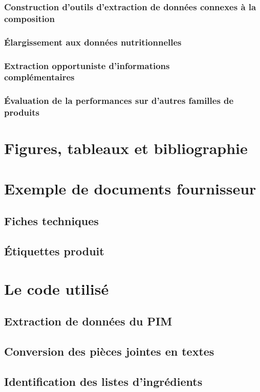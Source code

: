 \documentclass{report}
\begin{document}
        \section{Construction d'outils d'extraction de données connexes à la composition}
        \section{\'{E}largissement aux données nutritionnelles}
        \section{Extraction \og opportuniste \fg d'informations \\ complémentaires}
        \section{\'{E}valuation de la performances sur d'autres familles de produits}


\appendix
\part{Figures, tableaux et bibliographie}
    \listoftables
    \listoffigures
    
    
\part{Exemple de documents fournisseur}
    \chapter{Fiches techniques}
    \chapter{\'{E}tiquettes produit}
\part{Le code utilisé}
    \chapter{Extraction de données du PIM}
    \chapter{Conversion des pièces jointes en textes}
    \chapter{Identification des listes d'ingrédients}
\end{document}
